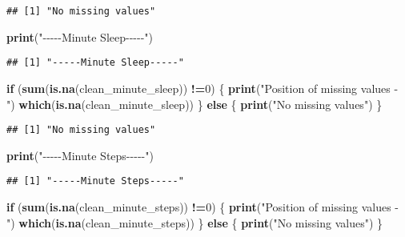 \documentclass[
]{article}
\newenvironment{Shaded}{\begin{snugshade}}{\end{snugshade}}
\newcommand{\ControlFlowTok}[1]{\textcolor[rgb]{0.13,0.29,0.53}{\textbf{#1}}}
\newcommand{\DecValTok}[1]{\textcolor[rgb]{0.00,0.00,0.81}{#1}}
\newcommand{\FunctionTok}[1]{\textcolor[rgb]{0.13,0.29,0.53}{\textbf{#1}}}
\newcommand{\NormalTok}[1]{#1}
\newcommand{\SpecialCharTok}[1]{\textcolor[rgb]{0.81,0.36,0.00}{\textbf{#1}}}
\newcommand{\StringTok}[1]{\textcolor[rgb]{0.31,0.60,0.02}{#1}}
\begin{document}
\begin{verbatim}
## [1] "No missing values"
\end{verbatim}

\begin{Shaded}
\begin{Highlighting}[]
\FunctionTok{print}\NormalTok{(}\StringTok{"{-}{-}{-}{-}{-}Minute Sleep{-}{-}{-}{-}{-}"}\NormalTok{)}
\end{Highlighting}
\end{Shaded}

\begin{verbatim}
## [1] "-----Minute Sleep-----"
\end{verbatim}

\begin{Shaded}
\begin{Highlighting}[]
\ControlFlowTok{if}\NormalTok{ (}\FunctionTok{sum}\NormalTok{(}\FunctionTok{is.na}\NormalTok{(clean\_minute\_sleep)) }\SpecialCharTok{!=}\DecValTok{0}\NormalTok{) \{}
  \FunctionTok{print}\NormalTok{(}\StringTok{"Position of missing values {-} "}\NormalTok{)}
  \FunctionTok{which}\NormalTok{(}\FunctionTok{is.na}\NormalTok{(clean\_minute\_sleep))}
\NormalTok{\} }\ControlFlowTok{else}\NormalTok{ \{}
  \FunctionTok{print}\NormalTok{(}\StringTok{"No missing values"}\NormalTok{)}
\NormalTok{\}}
\end{Highlighting}
\end{Shaded}

\begin{verbatim}
## [1] "No missing values"
\end{verbatim}

\begin{Shaded}
\begin{Highlighting}[]
\FunctionTok{print}\NormalTok{(}\StringTok{"{-}{-}{-}{-}{-}Minute Steps{-}{-}{-}{-}{-}"}\NormalTok{)}
\end{Highlighting}
\end{Shaded}

\begin{verbatim}
## [1] "-----Minute Steps-----"
\end{verbatim}

\begin{Shaded}
\begin{Highlighting}[]
\ControlFlowTok{if}\NormalTok{ (}\FunctionTok{sum}\NormalTok{(}\FunctionTok{is.na}\NormalTok{(clean\_minute\_steps)) }\SpecialCharTok{!=}\DecValTok{0}\NormalTok{) \{}
  \FunctionTok{print}\NormalTok{(}\StringTok{"Position of missing values {-} "}\NormalTok{)}
  \FunctionTok{which}\NormalTok{(}\FunctionTok{is.na}\NormalTok{(clean\_minute\_steps))}
\NormalTok{\} }\ControlFlowTok{else}\NormalTok{ \{}
  \FunctionTok{print}\NormalTok{(}\StringTok{"No missing values"}\NormalTok{)}
\NormalTok{\}}
\end{Highlighting}
\end{Shaded}
\end{document}
